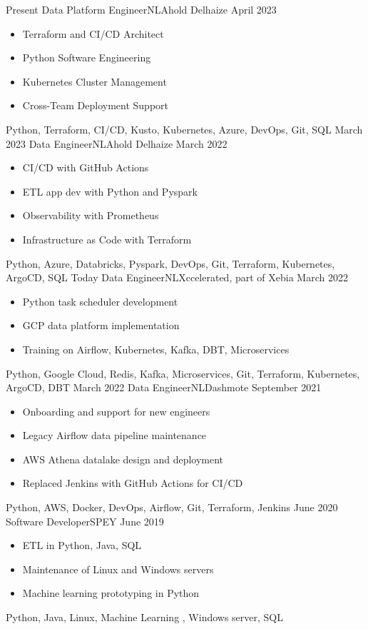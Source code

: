 \begin{experiences}
  \experience
  {Present}   {Data Platform Engineer}{NL}{Ahold Delhaize}
  {April 2023} {
    \begin{itemize}
      \item Terraform and CI/CD Architect
      \item Python Software Engineering
      \item Kubernetes Cluster Management
      \item Cross-Team Deployment Support
    \end{itemize}
  }
  {Python, Terraform, CI/CD, Kusto, Kubernetes, Azure, DevOps, Git, SQL}
  \emptySeparator
  \experience
  {March 2023}   {Data Engineer}{NL}{Ahold Delhaize}
  {March 2022} {
    \begin{itemize}
      \item CI/CD with GitHub Actions
      \item ETL app dev with Python and Pyspark
      \item Observability with Prometheus
      \item Infrastructure as Code with Terraform
    \end{itemize}
  }
  {Python, Azure, Databricks, Pyspark, DevOps, Git, Terraform, Kubernetes, ArgoCD, SQL}
  \emptySeparator
  \experience
  {Today}   {Data Engineer}{NL}{Xccelerated, part of Xebia}
  {March 2022} {
    \begin{itemize}
      \item Python task scheduler development
      \item GCP data platform implementation
      \item Training on Airflow, Kubernetes, Kafka, DBT, Microservices    \end{itemize}
  }
  {Python, Google Cloud, Redis, Kafka, Microservices, Git, Terraform, Kubernetes, ArgoCD, DBT}
  \emptySeparator
  \experience
  {March 2022}   {Data Engineer}{NL}{Dashmote}
  {September 2021} {
    \begin{itemize}
      \item Onboarding and support for new engineers
      \item Legacy Airflow data pipeline maintenance
      \item AWS Athena datalake design and deployment
      \item Replaced Jenkins with GitHub Actions for CI/CD
    \end{itemize}
  }
  {Python, AWS, Docker, DevOps, Airflow, Git, Terraform, Jenkins}
  \emptySeparator
  \experience
  {June 2020}   {Software Developer}{SP}{EY}
  {June 2019} {
    \begin{itemize}
      \item ETL in Python, Java, SQL
      \item Maintenance of Linux and Windows servers
      \item Machine learning prototyping in Python
    \end{itemize}
  }
  {Python, Java, Linux, Machine Learning , Windows server, SQL}
  \emptySeparator
\end{experiences}
